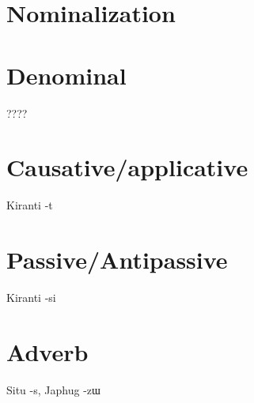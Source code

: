 \documentclass[oldfontcommands,oneside,a4paper,11pt]{article}
\newcommand{\ipa}[1]{{\phon \mbox{#1}}} %
\begin{document}
\section{Nominalization}


\citet{jacques03s.houzhui}

\section{Denominal}

????

\section{Causative/applicative}

Kiranti \ipa{-t}
\citet{michailovsky85dental}

\section{Passive/Antipassive}

Kiranti \ipa{-si}

\section{Adverb}

Situ \ipa{-s}, Japhug \ipa{-zɯ}



\end{document}
